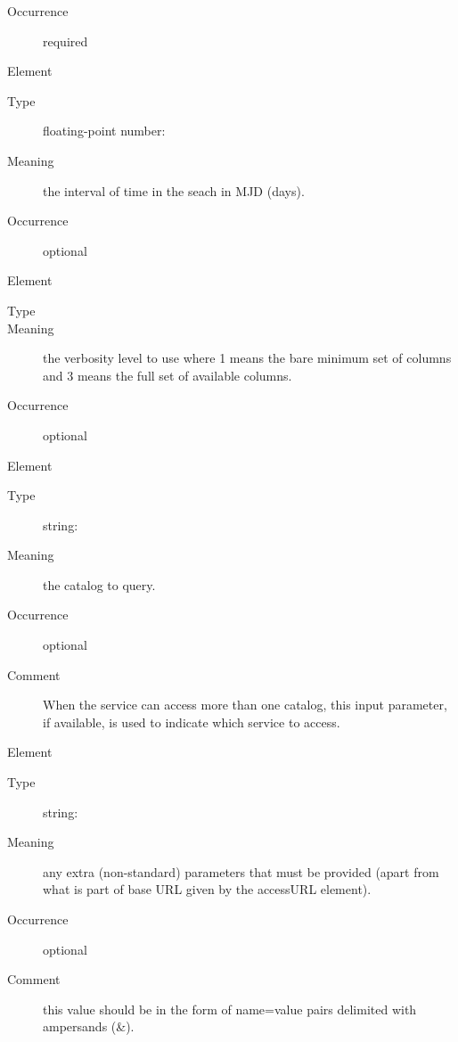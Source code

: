 \documentclass[11pt,a4paper]{ivoa} 
\begin{document}
\begin{generated}
\begin{bigdescription}
\begin{description}
\item[Occurrence] required

\end{description}

\item[Element \xmlel{time}] \begin{description} \item[Type]
floating-point number:  \item[Meaning] the interval of
time in the seach in MJD (days).  \item[Occurrence] optional

\end{description}


\item[Element \xmlel{verb}] \begin{description} \item[Type]
 \item[Meaning] the verbosity level to use
where 1 means the bare minimum set of columns and 3 means the full set
of available columns.
               
\item[Occurrence] optional 

\end{description} \item[Element \xmlel{catalog}] \begin{description}
\item[Type] string:  \item[Meaning] the catalog to
query.  
               
\item[Occurrence] optional \item[Comment] When the service can access
more than one catalog, this input parameter, if available, is used to
indicate which service to access.
               

\end{description} \item[Element \xmlel{extras}] \begin{description}
\item[Type] string:  \item[Meaning] any extra
(non-standard) parameters that must be provided (apart from what is part
of base URL given by the accessURL element).
               
\item[Occurrence] optional \item[Comment] this value should be in the
form of name=value pairs delimited with ampersands (\&).  
               

\end{description}


\end{bigdescription}\endgroup

\endgroup \end{generated}
\end{document}
